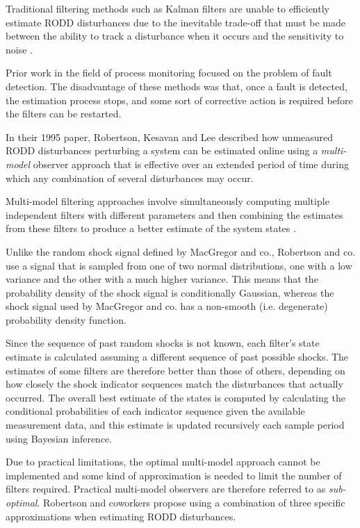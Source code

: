 Traditional filtering methods such as Kalman filters are unable to efficiently estimate RODD disturbances due to the inevitable trade-off that must be made between the ability to track a disturbance when it occurs and the sensitivity to noise \cite{robertson_detection_1995}.

Prior work in the field of process monitoring focused on the problem of fault detection. The disadvantage of these methods was that, once a fault is detected, the estimation process stops, and some sort of corrective action is required before the filters can be restarted. 

In their 1995 paper, Robertson, Kesavan and Lee \cite{robertson_detection_1995} described how unmeasured RODD disturbances perturbing a system can be estimated online using a \textit{multi-model} observer approach that is effective over an extended period of time during which any combination of several disturbances may occur.

Multi-model filtering approaches involve simultaneously computing multiple independent filters with different parameters and then combining the estimates from these filters to produce a better estimate of the system states \cite{jaffer_estimation_1971, buxbaum_recursive_1970, tugnait_detection_1982}.

Unlike the random shock signal defined by MacGregor and co., Robertson and co. use a signal that is sampled from one of two normal distributions, one with a low variance and the other with a much higher variance. This means that the probability density of the shock signal is conditionally Gaussian, whereas the shock signal used by MacGregor and co. has a non-smooth (i.e. degenerate) probability density function.

Since the sequence of past random shocks is not known, each filter's state estimate is calculated assuming a different sequence of past possible shocks. The estimates of some filters are therefore better than those of others, depending on how closely the shock indicator sequences match the disturbances that actually occurred. The overall best estimate of the states is computed by calculating the conditional probabilities of each indicator sequence given the available measurement data, and this estimate is updated recursively each sample period using Bayesian inference.

Due to practical limitations, the optimal multi-model approach cannot be implemented and some kind of approximation is needed to limit the number of filters required. Practical multi-model observers are therefore referred to as \textit{sub-optimal}. Robertson and coworkers propose using a combination of three specific approximations when estimating RODD disturbances.

